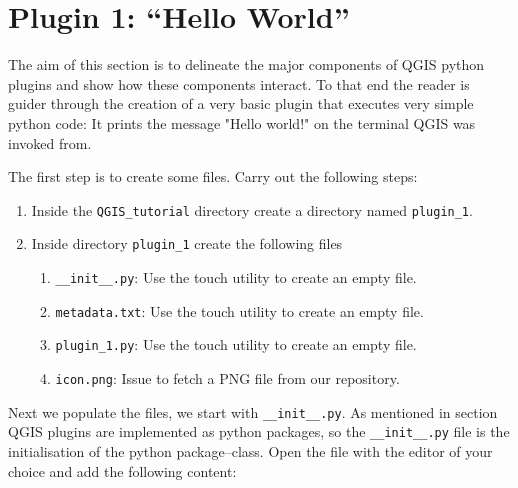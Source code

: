 \section{Plugin 1: ``Hello World''}
\label{sect:plugin_1}
\par %
The aim of this section is to delineate the major components of QGIS python plugins and show how these components interact. To that end the reader is guider through the creation of a very basic plugin that executes very simple python code: It prints the message "Hello world!" on the terminal QGIS was invoked from.
\par %
The first step is to create some files. Carry out the following steps:
\begin{enumerate}
  \item Inside the \lstinline{QGIS_tutorial} directory create a directory named \lstinline{plugin_1}.
  \item Inside directory \lstinline{plugin_1} create the following files
  \begin{enumerate}
    \item \lstinline{__init__.py}: Use the touch utility to create an empty file.
    \item \lstinline{metadata.txt}: Use the touch utility to create an empty file.
    \item \lstinline{plugin_1.py}: Use the touch utility to create an empty file.
    \item \lstinline{icon.png}: Issue \lstinline{} to fetch a PNG file from our repository.
  \end{enumerate}
\end{enumerate}
Next we populate the files, we start with \lstinline{__init__.py}. As mentioned in section \label{sect:introduction} QGIS plugins are implemented as python packages, so the \lstinline{__init__.py} file is the initialisation of the python package--class. Open the file with the editor of your choice and add the following content:
